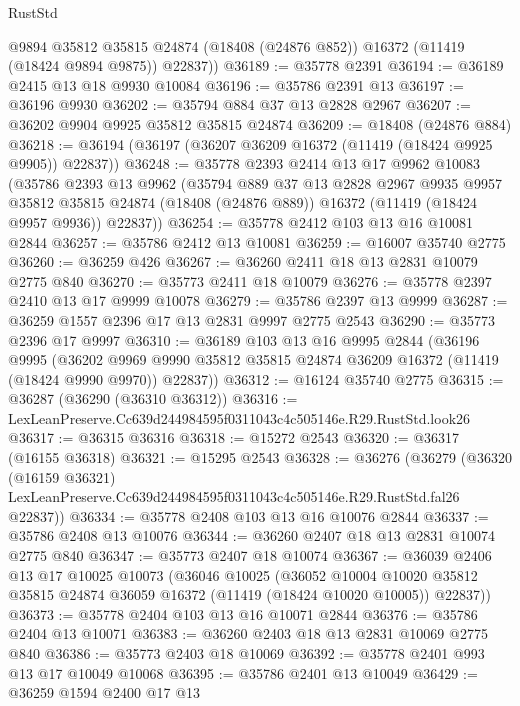 \begin{lexlean}{RustStd}
\begin{coremodule}
        @9894
        @35812
        @35815
        @24874
        (@18408 (@24876 @852))
        @16372
        (@11419 (@18424 @9894 @9875))
        @22837))
@36189 := @35778 @2391
@36194 := @36189 @2415 @13 @18 @9930 @10084
@36196 := @35786 @2391 @13
@36197 := @36196 @9930
@36202 := @35794 @884 @37 @13 @2828 @2967
@36207 := @36202 @9904 @9925 @35812 @35815 @24874
@36209 := @18408 (@24876 @884)
@36218 := @36194 (@36197 (@36207 @36209 @16372 (@11419 (@18424 @9925 @9905)) @22837))
@36248 := @35778
    @2393
    @2414
    @13
    @17
    @9962
    @10083
    (@35786
      @2393
      @13
      @9962
      (@35794
        @889
        @37
        @13
        @2828
        @2967
        @9935
        @9957
        @35812
        @35815
        @24874
        (@18408 (@24876 @889))
        @16372
        (@11419 (@18424 @9957 @9936))
        @22837))
@36254 := @35778 @2412 @103 @13 @16 @10081 @2844
@36257 := @35786 @2412 @13 @10081
@36259 := @16007 @35740 @2775
@36260 := @36259 @426
@36267 := @36260 @2411 @18 @13 @2831 @10079 @2775 @840
@36270 := @35773 @2411 @18 @10079
@36276 := @35778 @2397 @2410 @13 @17 @9999 @10078
@36279 := @35786 @2397 @13 @9999
@36287 := @36259 @1557 @2396 @17 @13 @2831 @9997 @2775 @2543
@36290 := @35773 @2396 @17 @9997
@36310 := @36189
    @103
    @13
    @16
    @9995
    @2844
    (@36196
      @9995
      (@36202 @9969 @9990 @35812 @35815 @24874 @36209 @16372 (@11419 (@18424 @9990 @9970)) @22837))
@36312 := @16124 @35740 @2775
@36315 := @36287 (@36290 (@36310 @36312))
@36316 := LexLeanPreserve.Cc639d244984595f0311043c4c505146e.R29.RustStd.look26
@36317 := @36315 @36316
@36318 := @15272 @2543
@36320 := @36317 (@16155 @36318)
@36321 := @15295 @2543
@36328 := @36276
    (@36279
      (@36320
        (@16159 @36321)
        LexLeanPreserve.Cc639d244984595f0311043c4c505146e.R29.RustStd.fal26
        @22837))
@36334 := @35778 @2408 @103 @13 @16 @10076 @2844
@36337 := @35786 @2408 @13 @10076
@36344 := @36260 @2407 @18 @13 @2831 @10074 @2775 @840
@36347 := @35773 @2407 @18 @10074
@36367 := @36039
    @2406
    @13
    @17
    @10025
    @10073
    (@36046
      @10025
      (@36052
        @10004
        @10020
        @35812
        @35815
        @24874
        @36059
        @16372
        (@11419 (@18424 @10020 @10005))
        @22837))
@36373 := @35778 @2404 @103 @13 @16 @10071 @2844
@36376 := @35786 @2404 @13 @10071
@36383 := @36260 @2403 @18 @13 @2831 @10069 @2775 @840
@36386 := @35773 @2403 @18 @10069
@36392 := @35778 @2401 @993 @13 @17 @10049 @10068
@36395 := @35786 @2401 @13 @10049
@36429 := @36259
    @1594
    @2400
    @17
    @13

\end{coremodule}
\end{lexlean}
